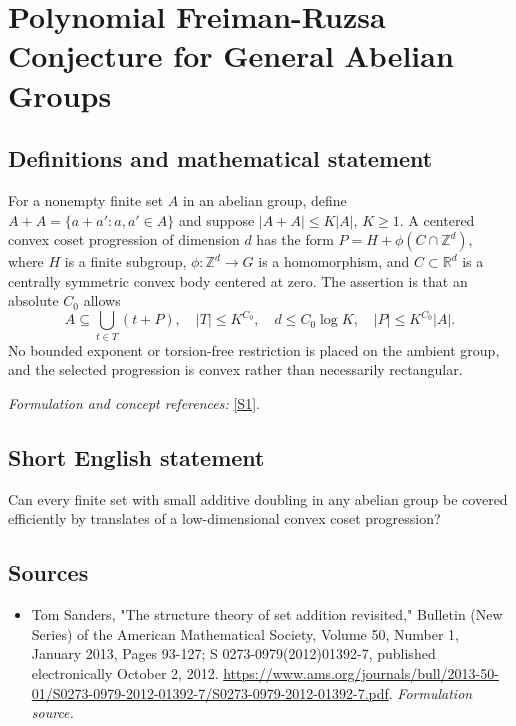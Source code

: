 \documentclass[11pt]{article}
\begin{document}
\section*{\texorpdfstring{Polynomial Freiman-Ruzsa Conjecture for General Abelian Groups}{Polynomial Freiman-Ruzsa Conjecture for General Abelian Groups}}\label{statement}
\subsection{Definitions and mathematical statement}
For a nonempty finite set $A$ in an abelian group, define $A+A=\{a+a':a,a'\in A\}$ and suppose $|A+A|\le K|A|$, $K\ge1$. A centered convex coset progression of dimension $d$ has the form
$P=H+\phi(C\cap{\mathbb{Z}}^d)$, where $H$ is a finite subgroup, $\phi:{\mathbb{Z}}^d\to G$ is a homomorphism, and $C\subset{\mathbb{R}}^d$ is a centrally symmetric convex body centered at zero. The assertion is that an absolute $C_0$ allows
\[
 A\subseteq\bigcup_{t\in T}(t+P),\quad |T|\le K^{C_0},
 \quad d\le C_0\log K,\quad |P|\le K^{C_0}|A|.
\]
No bounded exponent or torsion-free restriction is placed on the ambient group, and the selected progression is convex rather than necessarily rectangular.
\par\smallskip\textit{Formulation and concept references:} \href{https://www.ams.org/journals/bull/2013-50-01/S0273-0979-2012-01392-7/S0273-0979-2012-01392-7.pdf}{[S1]}.

\subsection{Short English statement}
Can every finite set with small additive doubling in any abelian group be covered efficiently by translates of a low-dimensional convex coset progression?
\subsection{Sources}
\begin{itemize}
\item[S1]Tom Sanders, "The structure theory of set addition revisited," Bulletin (New Series) of the American Mathematical Society, Volume 50, Number 1, January 2013, Pages 93-127; S 0273-0979(2012)01392-7, published electronically October 2, 2012.
\url{https://www.ams.org/journals/bull/2013-50-01/S0273-0979-2012-01392-7/S0273-0979-2012-01392-7.pdf}.
\textit{Formulation source.}
\end{itemize}
\end{document}
